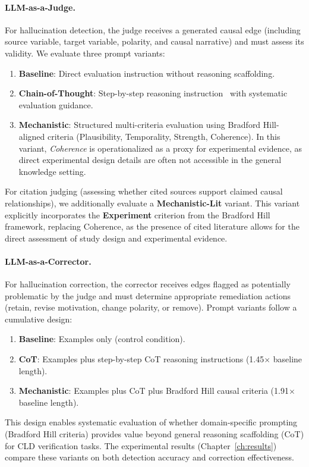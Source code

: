 \paragraph{LLM-as-a-Judge.}
For hallucination detection, the judge receives a generated causal edge (including source variable, target variable, polarity, and causal narrative) and must assess its validity. We evaluate three prompt variants:
\begin{enumerate}
    \item \textbf{Baseline}: Direct evaluation instruction without reasoning scaffolding.
    \item \textbf{Chain-of-Thought}: Step-by-step reasoning instruction~\citep{kojima2022large} with systematic evaluation guidance.
    \item \textbf{Mechanistic}: Structured multi-criteria evaluation using Bradford Hill-aligned criteria (Plausibility, Temporality, Strength, Coherence). In this variant, \textit{Coherence} is operationalized as a proxy for experimental evidence, as direct experimental design details are often not accessible in the general knowledge setting.
\end{enumerate}

For citation judging (assessing whether cited sources support claimed causal relationships), we additionally evaluate a \textbf{Mechanistic-Lit} variant. This variant explicitly incorporates the \textbf{Experiment} criterion from the Bradford Hill framework, replacing Coherence, as the presence of cited literature allows for the direct assessment of study design and experimental evidence.

\paragraph{LLM-as-a-Corrector.}
For hallucination correction, the corrector receives edges flagged as potentially problematic by the judge and must determine appropriate remediation actions (retain, revise motivation, change polarity, or remove). Prompt variants follow a cumulative design:
\begin{enumerate}
    \item \textbf{Baseline}: Examples only (control condition).
    \item \textbf{CoT}: Examples plus step-by-step CoT reasoning instructions (1.45$\times$ baseline length).
    \item \textbf{Mechanistic}: Examples plus CoT plus Bradford Hill causal criteria (1.91$\times$ baseline length).
\end{enumerate}

This design enables systematic evaluation of whether domain-specific prompting (Bradford Hill criteria) provides value beyond general reasoning scaffolding (CoT) for CLD verification tasks. The experimental results (Chapter~\ref{ch:results}) compare these variants on both detection accuracy and correction effectiveness.











